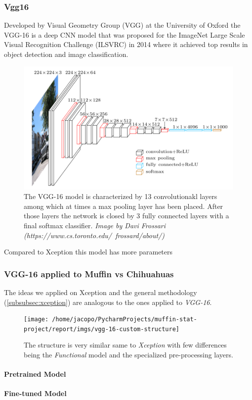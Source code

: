\subsubsection{Vgg16}
Developed by Visual Geometry Group (VGG) at the University of Oxford the VGG-16\cite{simonyan2015deep} is a deep CNN model that
was proposed for the ImageNet Large Scale Visual Recognition Challenge (ILSVRC) in 2014 where it achieved top results in object detection and image classification.

\begin{figure}[h]
    \includegraphics[scale=0.7]{imgs/vgg_arch}
    \caption{
        The VGG-16 model is characterized by 13 convolutionakl layers among which at times a max pooling layer has been placed.
        After those layers the network is closed by 3 fully connected layers with a final softmax classifier.
        \textit{Image by Davi Frossari (https://www.cs.toronto.edu/~frossard/about/)}
    }\label{fig:vgg16}
\end{figure}

Compared to Xception this model has more parameters

\subsubsection{VGG-16 applied to Muffin vs Chihuahuas}
The ideas we applied on Xception and the general methodology (\ref{subsubsec:xception}) are analogous to the ones
applied to \textit{VGG-16}.

\begin{figure}[h]

    \centering
    \texttt{[image: /home/jacopo/PycharmProjects/muffin-stat-project/report/imgs/vgg-16-custom-structure]}
    \caption{
        The structure is very similar same to \textit{Xception} with few differences being the \textit{Functional} model
        and the specialized pre-processing layers.
    }\label{fig:figurevgg16}
\end{figure}

\paragraph{Pretrained Model}
\paragraph{Fine-tuned Model}
